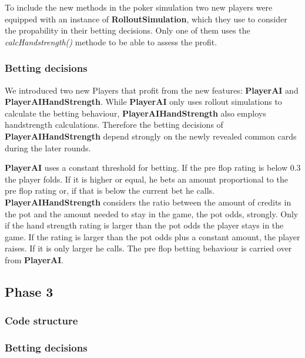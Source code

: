 To include the new methods in the poker simulation two new players were equipped with an instance of
\textbf{RolloutSimulation}, which they use to consider the propability in their betting decisions. Only one of them uses
the \textit{calcHandstrength()} methode to be able to assess the profit.


\subsubsection{Betting decisions}

We introduced two new Players that profit from the new features: \textbf{PlayerAI} and \textbf{PlayerAIHandStrength}.
While \textbf{PlayerAI} only uses rollout simulations to calculate the betting behaviour, \textbf{PlayerAIHandStrength}
also employs handstrength calculations. Therefore the betting decisions of \textbf{PlayerAIHandStrength} depend strongly
on the newly revealed common cards during the later rounds.

\textbf{PlayerAI} uses a constant threshold for betting. If the pre flop rating is below 0.3 the player folds. If it is
higher or equal, he bets an amount proportional to the pre flop rating or, if that is below the current bet he calls.
\textbf{PlayerAIHandStrength} considers the ratio between the amount of credits in the pot and the amount needed to stay
in the game, the pot odds, strongly. Only if the hand strength rating is larger than the pot odds the player stays in
the game. If the rating is larger than the pot odds plus a constant amount, the player raises. If it is only larger he
calls. The pre flop betting behaviour is carried over from \textbf{PlayerAI}.

\subsection{Phase 3}

\subsubsection{Code structure}

\subsubsection{Betting decisions}


